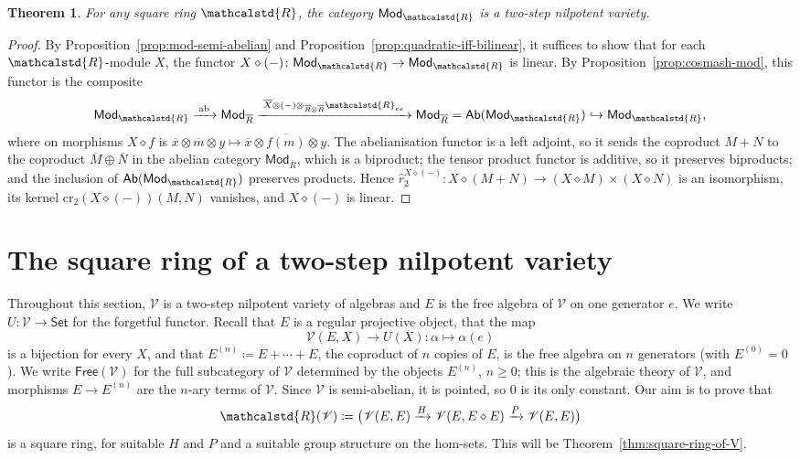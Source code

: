 \documentclass[reqno,a4paper]{amsart}
\theoremstyle{plain}
\newtheorem{theorem}[subsection]{Theorem}
\theoremstyle{definition}
\newcommand{\DefEq}{\coloneq}
\newcommand{\V}{\ensuremath{\mathcal{V}}}
\newcommand{\R}{\ensuremath{\mathcalstd{R}}}
\newcommand{\Ab}{\ensuremath{\mathsf{Ab}}}
\newcommand{\Set}{\ensuremath{\mathsf{Set}}}
\newcommand{\Mod}{\ensuremath{\mathsf{Mod}}}
\newcommand{\Free}{\ensuremath{\mathsf{Free}}}
\newcommand{\cre}{\ensuremath{\mathrm{cr}}}
\DeclareMathOperator{\ab}{ab}
\newcommand{\U}{\ensuremath{U}}
\newcommand{\cosmash}{\ensuremath{\diamond}}
\newcommand{\cmF}[2]{\ensuremath{\hat{r}^{#1}_{#2}}}       %
\newcommand{\Ree}{\ensuremath{\R_{ee}}}
\newcommand{\Rbar}{\ensuremath{\overline{R}}}
\begin{document}
\begin{theorem}\label{thm:mod-nilpotent}
  For any square ring \(\R\), the category \(\Mod_{\R}\) is a two-step nilpotent variety.
\end{theorem}

\begin{proof}
  By Proposition~\ref{prop:mod-semi-abelian} and Proposition~\ref{prop:quadratic-iff-bilinear}, it suffices to show that for each \(\R\)-module \(X\), the functor \(X\cosmash(-)\colon \Mod_{\R}\to\Mod_{\R}\) is linear. By Proposition~\ref{prop:cosmash-mod}, this functor is the composite
  \[
    \Mod_{\R}\xrightarrow{\;\ab\;}\Mod_{\Rbar}\xrightarrow{\;\overline{X}\otimes(-)\otimes_{\Rbar\otimes\Rbar}\Ree\;}\Mod_{\Rbar}=\Ab(\Mod_{\R})\hookrightarrow\Mod_{\R}\text{,}
  \]
  where on morphisms \(X\cosmash f\) is \(\overline{x}\otimes\overline{m}\otimes y\mapsto\overline{x}\otimes\overline{f(m)}\otimes y\). The abelianisation functor is a left adjoint, so it sends the coproduct \(M+N\) to the coproduct \(\overline{M}\oplus\overline{N}\) in the abelian category \(\Mod_{\Rbar}\), which is a biproduct; the tensor product functor is additive, so it preserves biproducts; and the inclusion of \(\Ab(\Mod_{\R})\) preserves products. Hence \(\cmF{X\cosmash(-)}{2}\colon X\cosmash(M+N)\to(X\cosmash M)\times(X\cosmash N)\) is an isomorphism, its kernel \(\cre_{2}(X\cosmash(-))(M,N)\) vanishes, and \(X\cosmash(-)\) is linear.
\end{proof}

\section{The square ring of a two-step nilpotent variety}\label{sec:square-ring-of-V}

Throughout this section, \(\V\) is a two-step nilpotent variety of algebras and \(E\) is the free algebra of \(\V\) on one generator \(e\). We write \(\U\colon \V\to\Set\) for the forgetful functor. Recall that \(E\) is a regular projective object, that the map
\[
  \V(E,X)\to\U(X)\colon \alpha\mapsto\alpha(e)
\]
is a bijection for every \(X\), and that \(E^{(n)}\DefEq E+\cdots+E\), the coproduct of \(n\) copies of \(E\), is the free algebra on \(n\) generators (with \(E^{(0)}=0\)). We write \(\Free(\V)\) for the full subcategory of \(\V\) determined by the objects \(E^{(n)}\), \(n\geq 0\); this is the algebraic theory of \(\V\), and morphisms \(E\to E^{(n)}\) are the \(n\)-ary terms of \(\V\). Since \(\V\) is semi-abelian, it is pointed, so \(0\) is its only constant. Our aim is to prove that
\[
  \R(\V)\DefEq\bigl(\V(E,E)\xrightarrow{H}\V(E,E\cosmash E)\xrightarrow{P}\V(E,E)\bigr)
\]
is a square ring, for suitable \(H\) and \(P\) and a suitable group structure on the hom-sets. This will be Theorem~\ref{thm:square-ring-of-V}.
\end{document}
